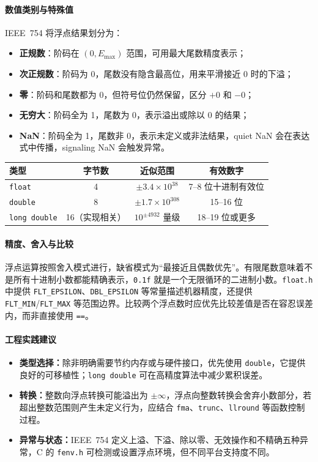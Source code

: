 \paragraph{数值类别与特殊值}
IEEE~754 将浮点结果划分为：
\begin{itemize}
  \item \textbf{正规数}：阶码在 $(0, E_{\max})$ 范围，可用最大尾数精度表示；
  \item \textbf{次正规数}：阶码为 0，尾数没有隐含最高位，用来平滑接近 0 时的下溢；
  \item \textbf{零}：阶码和尾数都为 0，但符号位仍然保留，区分 $+0$ 和 $-0$；
  \item \textbf{无穷大}：阶码全为 1，尾数为 0，表示溢出或除以 0 的结果；
  \item \textbf{NaN}：阶码全为 1，尾数非 0，表示未定义或非法结果，quiet NaN 会在表达式中传播，signaling NaN 会触发异常。
\end{itemize}

\begin{center}
  \begin{tabular}{lccc}
    \toprule
    类型 & 字节数 & 近似范围 & 有效数字 \\
    \midrule
    \texttt{float} & 4 & $\pm 3.4 \times 10^{38}$ & 7--8 位十进制有效位 \\
    \texttt{double} & 8 & $\pm 1.7 \times 10^{308}$ & 15--16 位 \\
    \texttt{long double} & 16（实现相关） & $10^{\pm 4932}$ 量级 & 18--19 位或更多 \\
    \bottomrule
  \end{tabular}
\end{center}

\paragraph{精度、舍入与比较}
浮点运算按照舍入模式进行，缺省模式为“最接近且偶数优先”。有限尾数意味着不是所有十进制小数都能精确表示，\texttt{0.1f} 就是一个无限循环的二进制小数。\texttt{float.h} 中提供 \texttt{FLT\_EPSILON}、\texttt{DBL\_EPSILON} 等常量描述机器精度，还提供 \texttt{FLT\_MIN}/\texttt{FLT\_MAX} 等范围边界。比较两个浮点数时应优先比较差值是否在容忍误差内，而非直接使用 \texttt{==}。

\paragraph{工程实践建议}
\begin{itemize}
  \item \textbf{类型选择：}除非明确需要节约内存或与硬件接口，优先使用 \texttt{double}，它提供良好的可移植性；\texttt{long double} 可在高精度算法中减少累积误差。
  \item \textbf{转换：}整数向浮点转换可能溢出为 $\pm\infty$，浮点向整数转换会舍弃小数部分，若超出整数范围则产生未定义行为，应结合 \texttt{fma}、\texttt{trunc}、\texttt{llround} 等函数控制过程。
  \item \textbf{异常与状态：}IEEE~754 定义上溢、下溢、除以零、无效操作和不精确五种异常，C 的 \texttt{fenv.h} 可检测或设置浮点环境，但不同平台支持度不同。
\end{itemize}

